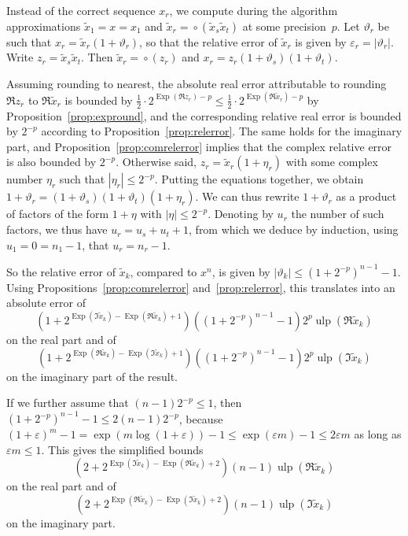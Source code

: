 \documentclass [12pt]{article}
\newcommand {\corr}[1]{{#1}}
\newcommand {\appro}[1]{\widetilde {#1}}
\newcommand {\Ulp}{{\operatorname {ulp}}}
\DeclareMathOperator{\Exp}{\operatorname {Exp}}
\newcommand {\round}{\operatorname {\circ}}
\renewcommand {\epsilon}{\varepsilon}
\renewcommand {\theta}{\vartheta}
\renewcommand {\leq}{\leqslant}
\begin{document}
Instead of the correct sequence $\corr x_r$, we compute during the algorithm
approximations $\appro x_1 = x = \corr x_1$ and
$\appro x_r = \round (\appro x_s \appro x_t)$
at some precision~$p$.
Let $\theta_r$ be such that $\corr x_r = \appro x_r (1 + \theta_r)$, so that
the relative error of $\appro x_r$ is given by $\epsilon_r = |\theta_r|$.
Write $z_r = \appro x_s \appro x_t$.
Then $\appro x_r = \round (z_r)$ and
$\corr x_r = z_r (1 + \theta_s)(1 + \theta_t)$.

Assuming rounding to nearest, the absolute real error attributable to
rounding $\Re z_r$ to $\Re \appro x_r$ is bounded by
$\frac {1}{2} \cdot 2^{\Exp (\Re z_r) - p}
\leq \frac {1}{2} \cdot 2^{\Exp (\Re \appro x_r) - p}$
by Proposition~\ref {prop:expround}, and the corresponding
relative real error is bounded by $2^{-p}$ according to
Proposition~\ref {prop:relerror}. The same holds for the imaginary part,
and Proposition~\ref {prop:comrelerror} implies that the complex
relative error is also bounded by $2^{-p}$. Otherwise said,
$z_r = \appro x_r (1 + \eta_r)$ with
some complex number $\eta_r$ such that $|\eta_r| \leq 2^{-p}$.
Putting the equations together, we obtain
$1 + \theta_r = (1 + \theta_s)(1 + \theta_t)(1 + \eta_r)$.
We can thus rewrite $1 + \theta_r$ as a product of factors of the
form $1 + \eta$ with $|\eta| \leq 2^{-p}$. Denoting by $u_r$ the
number of such factors, we thus have $u_r = u_s + u_t + 1$, from which
we deduce by induction, using $u_1 = 0 = n_1 - 1$,
that $u_r = n_r - 1$.

So the relative error of $\appro x_k$, compared to $x^n$, is given by
$|\theta_k| \leq (1 + 2^{-p})^{n-1} - 1$.
Using Propositions~\ref {prop:comrelerror}
and~\ref {prop:relerror}, this translates into an absolute error of
\[
\left( 1 + 2^{\Exp (\Im \appro x_k) - \Exp (\Re \appro x_k) + 1} \right)
\left( (1 + 2^{-p})^{n-1} - 1 \right)
2^p \Ulp (\Re \appro x_k)
\]
on the real part and of
\[
\left( 1 + 2^{\Exp (\Re \appro x_k) - \Exp (\Im \appro x_k) + 1} \right)
\left( (1 + 2^{-p})^{n-1} - 1 \right)
2^p \Ulp (\Im \appro x_k)
\]
on the imaginary part of the result.

If we further assume that $(n-1) 2^{-p} \leq 1$, then
$(1 + 2^{-p})^{n-1} - 1 \leq 2 (n - 1) 2^{-p}$,
because $(1+\varepsilon)^m-1 = \exp(m \log(1+\varepsilon)) - 1
\leq \exp(\varepsilon m) - 1 \leq 2 \varepsilon m$ as long as
$\varepsilon m \leq 1$. This gives the simplified bounds
\begin{equation} \label{eq:powui_re}
\left( 2 + 2^{\Exp (\Im \appro x_k) - \Exp (\Re \appro x_k) + 2} \right)
(n-1) \Ulp (\Re \appro x_k)
\end{equation}
on the real part and of
\begin{equation} \label{eq:powui_im}
\left( 2 + 2^{\Exp (\Re \appro x_k) - \Exp (\Im \appro x_k) + 2} \right)
(n-1) \Ulp (\Im \appro x_k)
\end{equation}
on the imaginary part.
\end{document}
